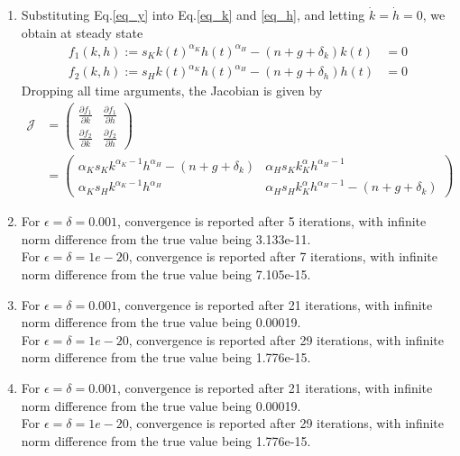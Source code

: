 \begin{enumerate}
\item
Substituting Eq.\eqref{eq_y} into Eq.\eqref{eq_k} and \eqref{eq_h}, and letting $\dot k=\dot h=0$, we obtain at steady state
\begin{align}
	f_1(k,h):=s_K k(t)^{\alpha_K}h(t)^{\alpha_H}-(n+g+\delta_k) k(t)&=0\\
	f_2(k,h):=s_H k(t)^{\alpha_K}h(t)^{\alpha_H}-(n+g+\delta_h) h(t)&=0
\end{align}
Dropping all time arguments, the Jacobian is given by
\begin{align}
	\mathcal J&=
		\begin{pmatrix}
			\frac{\partial f_1}{\partial k} & \frac{\partial f_1}{\partial h}\\
			\frac{\partial f_2}{\partial k} & \frac{\partial f_2}{\partial h}
		\end{pmatrix}\\
	&=
		\begin{pmatrix}
			\alpha_Ks_Kk^{\alpha_K-1}h^{\alpha_H}-(n+g+\delta_k) & \alpha_Hs_Kk^\alpha_Kh^{\alpha_H-1}\\
			\alpha_Ks_Hk^{\alpha_K-1}h^{\alpha_H} & \alpha_Hs_Hk^\alpha_Kh^{\alpha_H-1}-(n+g+\delta_k)
		\end{pmatrix}
\end{align}

\item
For $\epsilon=\delta=0.001$, convergence is reported after 5 iterations, with infinite norm difference from the true value being 3.133e-11.\\
For $\epsilon=\delta=1e-20$, convergence is reported after 7 iterations, with infinite norm difference from the true value being 7.105e-15.

\item
For $\epsilon=\delta=0.001$, convergence is reported after 21 iterations, with infinite norm difference from the true value being 0.00019.\\
For $\epsilon=\delta=1e-20$, convergence is reported after 29 iterations, with infinite norm difference from the true value being 1.776e-15.

\item
For $\epsilon=\delta=0.001$, convergence is reported after 21 iterations, with infinite norm difference from the true value being 0.00019.\\
For $\epsilon=\delta=1e-20$, convergence is reported after 29 iterations, with infinite norm difference from the true value being 1.776e-15.


\end{enumerate}
